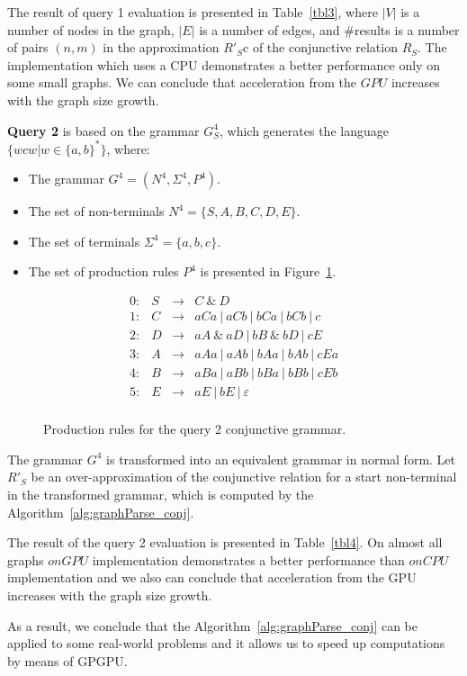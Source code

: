 The result of query 1 evaluation is presented in Table~\ref{tbl3}, where $|V|$ is a number of nodes in the graph, $|E|$ is a number of edges, and \#results is a number of pairs $(n,m)$ in the approximation $R'_S$c of the conjunctive relation $R_S$. The implementation which uses a CPU demonstrates a better performance only on some small graphs. We can conclude that acceleration from the $GPU$ increases with the graph size growth.

\textbf{Query 2} is based on the grammar $G^4_S$, which generates the language $\{wcw | w \in \{a,b\}^*\}$, where:
\begin{itemize}
	\item The grammar $G^4 = (N^4, \Sigma^4, P^4)$.
	\item The set of non-terminals $N^4 = \{S, A, B, C, D, E\}$.
	\item The set of terminals $\Sigma^4 = \{a, b, c\}.$
	\item The set of production rules $P^4$ is presented in Figure~\ref{ProductionRulesQuery4}.
\end{itemize}

\begin{figure}[h]
	\[
	\begin{array}{rccl}
	0: & S & \rightarrow & C ~\& ~ D \\ 
	1: & C & \rightarrow & aCa~|~aCb~|~bCa~|~bCb~|~c\\ 
	2: & D & \rightarrow & aA ~\& ~aD~|~bB ~\& ~bD~|~cE \\ 
	3: & A & \rightarrow & aAa~|~aAb~|~bAa~|~bAb~|~cEa\\ 
	4: & B & \rightarrow & aBa~|~aBb~|~bBa~|~bBb~|~cEb \\
	5: & E & \rightarrow & aE~|~bE~|~\varepsilon \\ 
	\end{array}
	\]
	\caption{Production rules for the query 2 conjunctive grammar.}
	\label{ProductionRulesQuery4}
\end{figure}

The grammar $G^4$ is transformed into an equivalent grammar in normal form. Let $R'_S$ be an over-approximation of the conjunctive relation for a start non-terminal in the transformed grammar, which is computed by the Algorithm~\ref{alg:graphParse_conj}.

The result of the query 2 evaluation is presented in Table~\ref{tbl4}. On almost all graphs $onGPU$ implementation demonstrates a better performance than $onCPU$ implementation and we also can conclude that acceleration from the GPU increases with the graph size growth.

As a result, we conclude that the Algorithm~\ref{alg:graphParse_conj} can be applied to some real-world problems and it allows us to speed up computations by means of GPGPU.